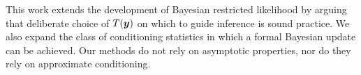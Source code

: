 \documentclass[ba]{imsart}
\def\bth{\mbox{\boldmath $\theta$}}
\newcommand{\by}{\mbox{\boldmath $y$}}
\newcommand{\bz}{\mbox{\boldmath $z$}}
\newcommand{\green}[1]{{\color{green}#1}}
\begin{document}



This work extends the development of Bayesian restricted likelihood by arguing that deliberate choice of $T(\by)$ on which to guide inference is sound practice. We also expand the class of conditioning statistics in which a formal Bayesian update can be achieved.  Our methods do not rely on asymptotic properties, nor do they rely on approximate conditioning.%
\end{document}
